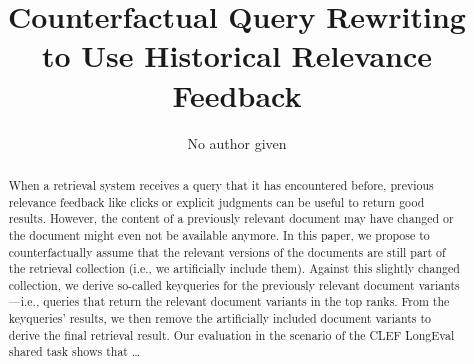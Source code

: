 \title{Counterfactual Query Rewriting \\ to Use Historical Relevance Feedback}


\author{No author given}
%
%
%
\maketitle              %
%
\begin{abstract}
When a retrieval system receives a query that it has encountered before, previous relevance feedback like clicks or explicit judgments can be useful to return good results. However, the content of a previously relevant document may have changed or the document might even not be available anymore. In this paper, we propose to counterfactually assume that the relevant versions of the documents are still part of the retrieval collection (i.e., we artificially include them). Against this slightly changed collection, we derive so-called keyqueries for the previously relevant document variants---i.e., queries that return the relevant document variants in the top ranks. From the keyqueries' results, we then remove the artificially included document variants to derive the final retrieval result. Our evaluation in the scenario of the CLEF LongEval shared task shows that \ldots

\end{abstract}
